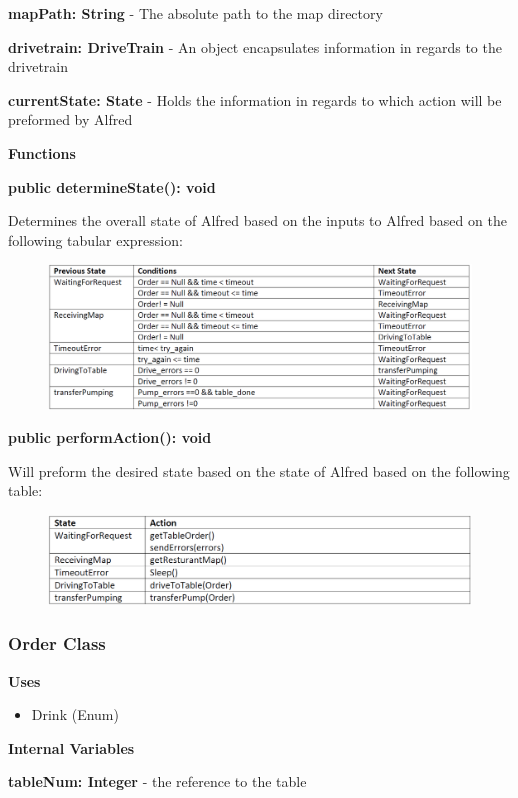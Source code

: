 \documentclass [10pt]{article}
\begin{document}
\textbf{mapPath: String} - The absolute path to the map directory

\textbf{drivetrain: DriveTrain} - An object encapsulates information in regards to the drivetrain

\textbf{currentState: State} - Holds the information in regards to which action will be preformed by Alfred


\textbf{Functions}

\textbf{public determineState(): void}

Determines the overall state of Alfred based on the inputs to Alfred based on the following tabular expression:
\begin{figure} [h!]
	\centering
	\includegraphics [scale = 0.4] {figures/AlfredSystem_DetermineState.png}
\end{figure}


\textbf{public performAction(): void}

Will preform the desired state based on the state of Alfred based on the following table:
\begin{figure} [h!]
	\centering
	\includegraphics [scale = 0.4] {figures/AlfredSystem_PerformAction.png}
\end{figure}
\subsubsection{Order Class}
\textbf{Uses}
\begin{itemize}
	\item Drink (Enum)
\end{itemize}


\textbf{Internal Variables}

\textbf{tableNum: Integer} - the reference to the table
\end{document}
